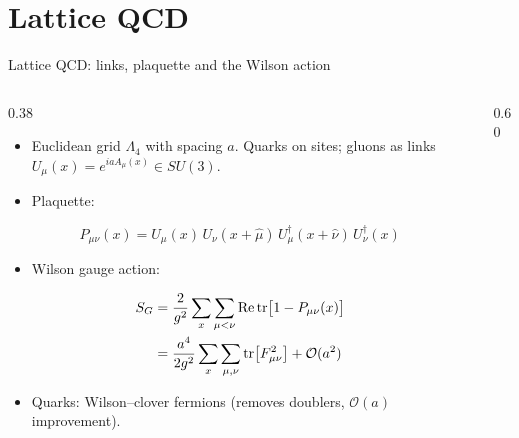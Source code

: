\section{Lattice QCD}

\begin{frame}{Lattice QCD: links, plaquette and the Wilson action}
  \begin{columns}[c]
    \begin{column}{0.38\textwidth}
      \begin{itemize}
        \item Euclidean grid $\Lambda_4$ with spacing $a$. Quarks on sites; gluons as links $U_\mu(x)=e^{iaA_\mu(x)}\in SU(3)$.
        \item Plaquette:
      \end{itemize}
      {\small \[ P_{\mu\nu}(x)=U_{\mu}(x)\,U_{\nu}(x+\hat{\mu})\,U^{\dagger}_{\mu}(x+\hat{\nu})\,U^{\dagger}_{\nu}(x) \]}
      \begin{itemize}
        \item Wilson gauge action:
      \end{itemize}
      \[ \begin{aligned} S_{G}&=\frac{2}{g^2}\sum_{x}\sum_{\mu<\nu}\mathrm{Re}\,\mathrm{tr}\big[1-P_{\mu\nu}(x)\big] \\ &= \frac{a^4}{2g^2}\sum_{x}\sum_{\mu,\nu}\mathrm{tr}\big[F_{\mu\nu}^2\big]+\mathcal{O}(a^2) \end{aligned} \]
      \begin{itemize}
        \item Quarks: Wilson--clover fermions (removes doublers, $\mathcal O(a)$ improvement).
      \end{itemize}
    \end{column}
    \begin{column}{0.60\textwidth}
      \centering
\end{column}
\end{columns}
\end{frame}
